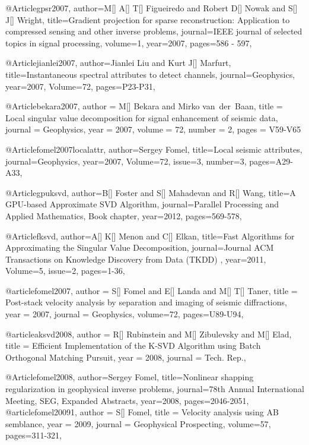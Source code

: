 @Article{gpsr2007,
author={M[] A[] T[] Figueiredo and Robert D[] Nowak and S[] J[] Wright},
title={Gradient projection for sparse reconstruction: Application to compressed sensing and other inverse problems},
journal={IEEE journal of selected topics in signal processing},
volume=1,
year=2007,
pages={586 - 597},
}

@Article{jianlei2007,
  author={Jianlei Liu and Kurt J[] Marfurt},
  title={Instantaneous spectral attributes to detect channels},
  journal={Geophysics},
  year=2007,
  Volume=72,
  pages={P23-P31},
}




@Article{bekara2007,
  author = 	 {M[] Bekara and Mirko van~der~Baan},
  title = 	 {Local singular value decomposition for signal enhancement of seismic data},
  journal = 	 {Geophysics},
  year = 	 2007,
  volume = 	 72,
  number = 	 2,
  pages = 	 {V59-V65}}

@Article{fomel2007localattr,
  author={Sergey Fomel},
  title={Local seismic attributes},
  journal={Geophysics},
  year=2007,
  Volume=72,
  issue=3,
  number=3,
  pages={A29-A33},
}

@Article{gpuksvd,
  author={B[] Foster and S[] Mahadevan and R[] Wang},
  title={A {GPU}-based Approximate {SVD} Algorithm},
  journal={Parallel Processing and Applied Mathematics, Book chapter},
  year=2012,
  pages={569-578},
}

@Article{fksvd,
  author={A[] K[] Menon and C[] Elkan},
  title={Fast Algorithms for Approximating the Singular Value Decomposition},
  journal={Journal ACM Transactions on Knowledge Discovery from Data (TKDD) },
  year=2011,
  Volume=5,
  issue=2,
  pages={1-36},
}






@article{fomel2007,
  author =	 {S[] Fomel and E[] Landa and M[] T[] Taner},
  title =	 {Post-stack velocity analysis by separation and imaging of seismic diffractions},
  year =	 2007,
  journal =	 {Geophysics},
  volume={72},
 pages=U89-U94,
}

@article{aksvd2008,
  author =	 {R[] Rubinstein and M[] Zibulevsky and M[] Elad},
  title =	 {Efficient Implementation of the {K-SVD} Algorithm using Batch Orthogonal Matching Pursuit},
  year =	 2008,
  journal =	 {Tech. Rep.},
}

@Article{fomel2008,
  author={Sergey Fomel},
  title={Nonlinear shapping regularization in geophysical inverse problems},
  journal={78th Annual International Meeting, SEG, Expanded Abstracts},
  year=2008,
  pages={2046-2051},
}
@article{fomel20091,
  author =	 {S[] Fomel},
  title =	 {Velocity analysis using {AB} semblance},
  year =	 2009,
  journal =	 {Geophysical Prospecting},
  volume={57},
 pages=311-321,
}

